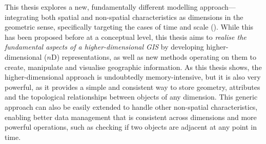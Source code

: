 This thesis explores a new, fundamentally different modelling approach---integrating both spatial and non-spatial characteristics as dimensions in the geometric sense, specifically targeting the cases of time and scale ().
While this has been proposed before at a conceptual level, this thesis aims to \emph{realise the fundamental aspects of a higher-dimensional GIS} by developing higher-dimensional ($n$D) representations, as well as new methods operating on them to create, manipulate and visualise geographic information.
As this thesis shows, the higher-dimensional approach is undoubtedly memory-intensive, but it is also very powerful, as it provides a simple and consistent way to store geometry, attributes and the topological relationships between objects of any dimension.
This generic approach can also be easily extended to handle other non-spatial characteristics, enabling better data management that is consistent across dimensions and more powerful operations, such as checking if two objects are adjacent at any point in time.

